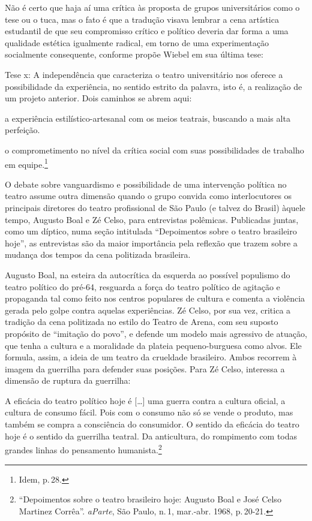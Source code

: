 Não é certo que haja aí uma crítica às proposta de grupos universitários
como o {\sc tese} ou o {\sc tuca}, mas o fato é que a tradução visava lembrar a cena
artística estudantil de que seu compromisso crítico e político deveria
dar forma a uma qualidade estética igualmente radical, em torno de uma
experimentação socialmente consequente, conforme propõe Wiebel em sua
última tese:

\startblockquote
Tese {\sc x}: A independência que caracteriza o teatro universitário
nos oferece a possibilidade da experiência, no sentido estrito da
palavra, isto é, a realização de um projeto anterior. Dois caminhos se
abrem aqui:

\startitemize[n,packed]
\item a experiência estilístico-artesanal com os meios teatrais, buscando a
mais alta perfeição.

\item o comprometimento no nível da crítica social com suas possibilidades
de trabalho em equipe.\footnote{Idem, p.\,28.}
\stopitemize
\stopblockquote

O debate sobre vanguardismo e possibilidade de uma intervenção
política no teatro assume outra dimensão quando o grupo convida como
interlocutores os principais diretores do teatro profissional de São
Paulo (e talvez do Brasil) àquele tempo, Augusto Boal e Zé Celso, para
entrevistas polêmicas. Publicadas juntas, como um díptico, numa seção
intitulada “Depoimentos sobre o teatro brasileiro hoje”, as
entrevistas são da maior importância pela reflexão que trazem sobre a
mudança dos tempos da cena politizada brasileira.

Augusto Boal, na esteira da autocrítica da esquerda ao possível
populismo do teatro político do pré-64, resguarda a força do teatro
político de agitação e propaganda tal como feito nos centros populares
de cultura e comenta a violência gerada pelo golpe contra aquelas
experiências. Zé Celso, por sua vez, critica a tradição da cena
politizada no estilo do Teatro de Arena, com seu suposto propósito de
“imitação do povo”, e defende um modelo mais agressivo de atuação, que
tenha a cultura e a moralidade da plateia pequeno-burguesa como alvos.
Ele formula, assim, a ideia de um teatro da crueldade brasileiro. Ambos
recorrem à imagem da guerrilha para defender suas posições. Para Zé
Celso, interessa a dimensão de ruptura da guerrilha:

\startblockquote
A eficácia do teatro político hoje é {[}\ldots{]} uma guerra contra a
cultura oficial, a cultura de consumo fácil. Pois com o consumo não só
se vende o produto, mas também se compra a consciência do consumidor. O
sentido da eficácia do teatro hoje é o sentido da guerrilha teatral. Da
anticultura, do rompimento com todas grandes linhas do pensamento
humanista.\footnote{“Depoimentos sobre o teatro brasileiro hoje: Augusto
  Boal e José Celso Martinez Corrêa”. {\it aParte}, São Paulo, n.\,1,
  mar.-abr. 1968, p.\,20-21.}
\stopblockquote

